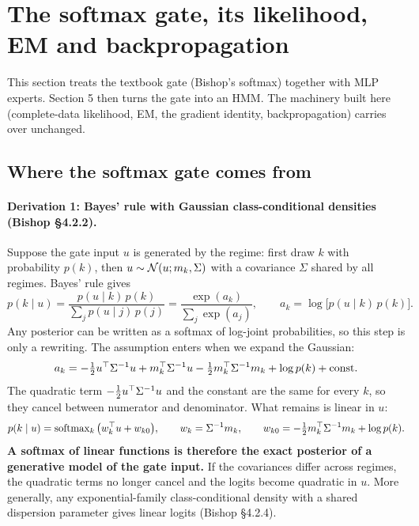 \section{The softmax gate, its likelihood, EM and backpropagation}

This section treats the textbook gate (Bishop's softmax) together with MLP experts. Section 5 then turns the gate into an HMM. The machinery built here (complete-data likelihood, EM, the gradient identity, backpropagation) carries over unchanged.

\subsection{Where the softmax gate comes from}

\paragraph{Derivation 1: Bayes' rule with Gaussian class-conditional densities (Bishop \S4.2.2).} Suppose the gate input $u$ is generated by the regime: first draw $k$ with probability $p(k)$, then $u\sim\mathcal{N}(u;m_k,\Sigma)$ with a covariance $\Sigma$ shared by all regimes. Bayes' rule gives
\begin{equation}
p(k\mid u)=\frac{p(u\mid k)\,p(k)}{\sum_j p(u\mid j)\,p(j)}=\frac{\exp(a_k)}{\sum_j\exp(a_j)},\qquad a_k=\log\big[p(u\mid k)\,p(k)\big].
\end{equation}
Any posterior can be written as a softmax of log-joint probabilities, so this step is only a rewriting. The assumption enters when we expand the Gaussian:
\begin{equation}
a_k=-\tfrac12 u^{\top}\Sigma^{-1}u+m_k^{\top}\Sigma^{-1}u-\tfrac12 m_k^{\top}\Sigma^{-1}m_k+\log p(k)+\text{const}.
\end{equation}
The quadratic term $-\frac12 u^{\top}\Sigma^{-1}u$ and the constant are the same for every $k$, so they cancel between numerator and denominator. What remains is linear in $u$:
\begin{equation}
p(k\mid u)=\operatorname{softmax}_k\big(w_k^{\top} u+w_{k0}\big),\qquad w_k=\Sigma^{-1}m_k,\qquad w_{k0}=-\tfrac12m_k^{\top}\Sigma^{-1}m_k+\log p(k).
\end{equation}
\textbf{A softmax of linear functions is therefore the exact posterior of a generative model of the gate input.} If the covariances differ across regimes, the quadratic terms no longer cancel and the logits become quadratic in $u$. More generally, any exponential-family class-conditional density with a shared dispersion parameter gives linear logits (Bishop \S4.2.4).

